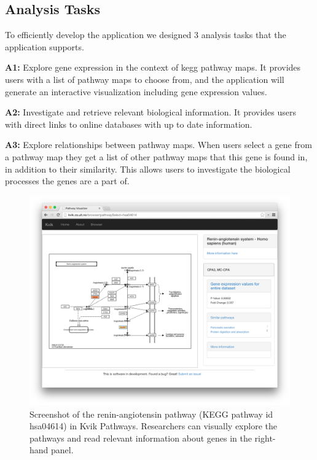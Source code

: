 \subsection{Analysis Tasks} 
To efficiently develop the application we designed 3 analysis tasks that the
application supports. 

\textbf{A1:} Explore gene expression in the context of \gls{kegg} pathway maps.
It provides users with a list of pathway maps to choose from, and the
application will generate an interactive visualization including gene expression
values. 

\textbf{A2:} Investigate and retrieve relevant biological information. It
provides users with direct links to online databases with up to date
information. 

\textbf{A3:} Explore relationships between pathway maps. When users select a
gene from a pathway map they get a list of other pathway maps that this gene is
found in, in addition to their similarity. This allows users to investigate the
biological processes the genes are a part of. 

\begin{figure}[htb!]
    \begin{centering}
    \includegraphics[width=\textwidth]{figures/kvikpwfig.png}
        \caption[Screenshot of the renin-angiotensin pathway in Kvik
        Pathways]{Screenshot of the renin-angiotensin pathway (KEGG pathway id
        hsa04614) in Kvik Pathways. Researchers can visually explore the
        pathways and read relevant information about genes in the right-hand
        panel.}
    \label{kvikpwfig}
    \end{centering} 
\end{figure}


